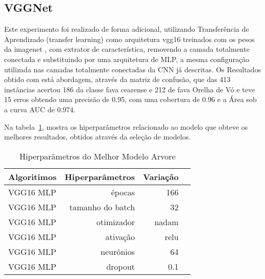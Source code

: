 \subsection{VGGNet}

Este experimento foi realizado de forma adicional, utilizando Transferência de Aprendizado (transfer learning) como arquitetura vgg16 treinados com os pesos da imagenet \cite{ImageNet}, com extrator de característica, removendo a camada totalmente conectada e substituindo por uma arquitetura de MLP, a mesma configuração utilizada nas camadas totalmente conectadas da CNN já descritas. Os Resultados obtido com está abordagem, através da matriz de confusão, que das 413 instâncias acertou 186 da classe fava cearense e 212 de fava Orelha de Vó e teve 15 erros obtendo uma precisão de 0.95, com uma cobertura de 0.96 e a Área sob a curva AUC de 0.974.



Na tabela~\ref{tabela:hiperparametros_best_models_vgg}, mostra os hiperparâmetros relacionado ao modelo que obteve os melhores resultados, obtidos através da seleção de modelos.

\begin{table}[H]
\centering
\caption{Hiperparâmetros do Melhor Modelo Arvore}
\label{tabela:hiperparametros_best_models_vgg}
\def\arraystretch{1.2}
\begin{tabular}{@{}lrrr@{}}
\toprule
{\textbf{Algoritimos}} & {\textbf{Hiperparâmetros}} & {\textbf{Variação}}  \\
\midrule
VGG16 MLP & épocas & 166 \\ 
VGG16 MLP & tamanho do batch & 32\\ 
VGG16 MLP & otimizador & nadam \\
VGG16 MLP & ativação & relu \\
VGG16 MLP & neurônios & 64 \\
VGG16 MLP & dropout & 0.1 \\
\bottomrule
\end{tabular}
\end{table}

\label{sec:resultados}